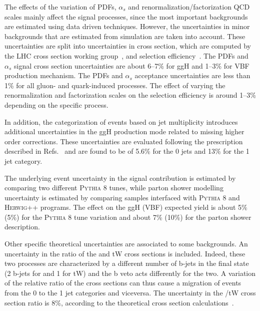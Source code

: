The effects of the variation of PDFs, $\alpha_s$ and renormalization/factorization QCD scales mainly affect the signal processes, since the most important backgrounds are estimated using data driven techniques. However, the uncertainties in minor backgrounds that are estimated from simulation are taken into account. These uncertainties are split into uncertainties in cross section, which are computed by the LHC cross section working group~\cite{YRtmp}, and selection efficiency~\cite{Butterworth:2015oua}. The PDFs and $\alpha_{s}$ signal cross section  uncertainties are about 6--7\% for ggH and 1--3\% for VBF production mechanism. The PDFs and $\alpha_{s}$ acceptance uncertainties are less than 1\% for all gluon- and quark-induced processes. The effect of varying the renormalization and factorization scales on the selection efficiency is around 1--3\% depending on the specific process. 

In addition, the categorization of events based on jet multiplicity introduces additional uncertainties in the ggH production mode related to missing higher order corrections. These uncertainties are evaluated following the prescription described in Refs.~\cite{Stewart:2011cf,Heinemeyer:2013tqa} and are found to be of 5.6\% for the 0 jets and 13\% for the 1 jet category.

The underlying event uncertainty in the signal contribution is estimated by comparing two different \textsc{Pythia 8} tunes, while parton shower modelling uncertainty is estimated by comparing samples interfaced with \textsc{Pythia 8} and \textsc{Herwig++} programs. 
The effect on the ggH (VBF) expected yield is about 5\% (5\%) for the \textsc{Pythia 8} tune variation and about 7\% (10\%) for the parton shower description.

Other specific theoretical uncertainties are associated to some backgrounds. An uncertainty in the ratio of the \ttbar and tW cross sections is included. Indeed, these two processes are characterized by a different number of b-jets in the final state (2 b-jets for \ttbar and 1 for tW) and the b veto acts differently for the two. A variation of the relative ratio of the cross sections can thus cause a migration of events from the 0 to the 1 jet categories and viceversa. The uncertainty in the \ttbar/tW cross section ratio is 8\%, according to the theoretical cross section calculations~\cite{topxsec,singletop}.

